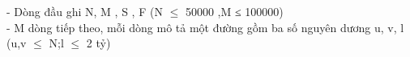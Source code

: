 - Dòng đầu ghi N, M , S , F (N $\le$  50000 ,M ≤ 100000)   
\\   - M dòng tiếp theo, mỗi dòng mô tả một đường gồm ba số nguyên dương u, v, l (u,v $\le$ N;l $\le$ 2 tỷ)  

\